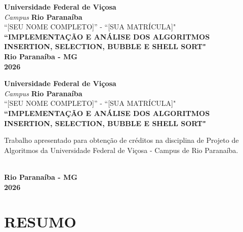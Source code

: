 \documentclass[12pt,arial]{article}
\author{[SEU NOME COMPLETO]}
\begin{document}
	\begin{titlepage}
		\begin{center}
			\textbf{Universidade Federal de Viçosa}
			\textit{\\Campus}
			\textbf{Rio Paranaíba}
			\textnormal{\\\vspace{4cm}``[SEU NOME COMPLETO]'' - ``[SUA MATRÍCULA]"}
			\textbf{\\\vspace{5cm}``IMPLEMENTAÇÃO E ANÁLISE DOS ALGORITMOS INSERTION, SELECTION, BUBBLE E SHELL SORT"}
			\textbf{\\\vspace{9cm}Rio Paranaíba - MG \\ 2026}
		\end{center}
	\end{titlepage}

		\begin{titlepage}
			\begin{center}
				\textbf{Universidade Federal de Viçosa}
				\textit{\\Campus}
				\textbf{Rio Paranaíba}
				\textnormal{\\\vspace{3cm}``[SEU NOME COMPLETO]'' - ``[SUA MATRÍCULA]"}
				\textbf{\\\vspace{4cm}``IMPLEMENTAÇÃO E ANÁLISE DOS ALGORITMOS INSERTION, SELECTION, BUBBLE E SHELL SORT"\vspace{3cm}}
					\begin{flushright}
						\begin{minipage}{.5\textwidth}
							\textnormal{Trabalho apresentado para obtenção de créditos na disciplina de Projeto de Algoritmos da Universidade Federal de Viçosa - Campus de Rio Paranaíba.}
						\end{minipage}
					\end{flushright}

				\textbf{\\\vspace{3cm}Rio Paranaíba - MG \\ 2026}

			\end{center}
		\end{titlepage}


		\section{RESUMO}
		
		\newpage
\end{document}
